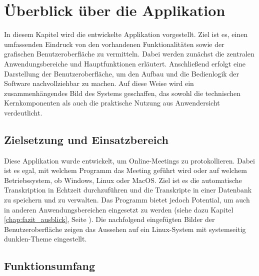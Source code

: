 
\chapter{Überblick über die Applikation}
\label{chap:ueberblick}

In diesem Kapitel wird die entwickelte Applikation vorgestellt. Ziel ist es, einen umfassenden Eindruck von den vorhandenen Funktionalitäten sowie der grafischen Benutzeroberfläche zu vermitteln. Dabei werden zunächst die zentralen Anwendungsbereiche und Hauptfunktionen erläutert. Anschließend erfolgt eine Darstellung der Benutzeroberfläche, um den Aufbau und die Bedienlogik der Software nachvollziehbar zu machen. Auf diese Weise wird ein zusammenhängendes Bild des Systems geschaffen, das sowohl die technischen Kernkomponenten als auch die praktische Nutzung aus Anwendersicht verdeutlicht.

\section{Zielsetzung und Einsatzbereich}
\label{sec:ziel}

Diese Applikation wurde entwickelt, um Online-Meetings zu protokollieren. Dabei ist es egal, mit welchem Programm das Meeting geführt wird oder auf welchem Betriebssystem, ob Windows, Linux oder MacOS. Ziel ist es die automatische Transkription in Echtzeit durchzuführen und die Transkripte in einer Datenbank zu speichern und zu verwalten. Das Programm bietet jedoch Potential, um auch in anderen Anwendungsbereichen eingesetzt zu werden (siehe dazu Kapitel \ref{chap:fazit_ausblick}, Seite \pageref{chap:fazit_ausblick}). Die nachfolgend eingefügten Bilder der Benutzeroberfläche zeigen das Aussehen auf ein Linux-System mit systemseitig dunklen-Theme eingestellt.


\section{Funktionsumfang}
\label{sec:umfang}

